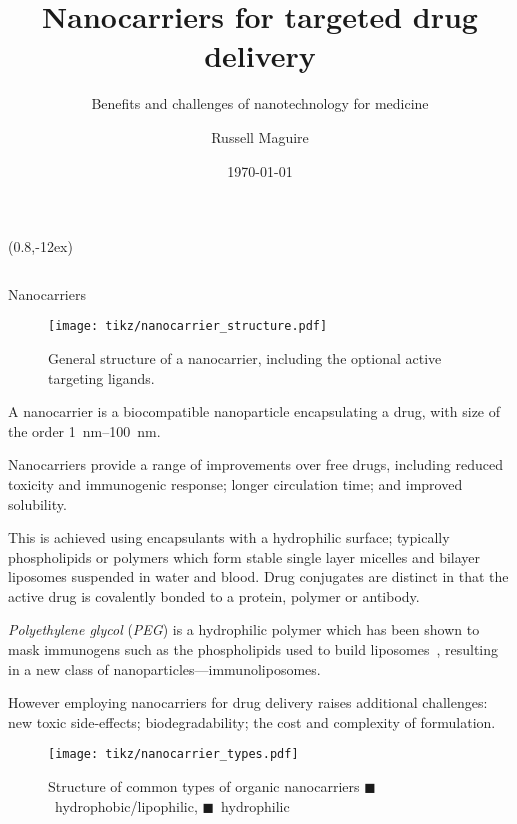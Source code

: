 \documentclass[final]{beamer}
\author{Russell Maguire}
\title{Nanocarriers for targeted drug delivery}
\subtitle{Benefits and challenges of nanotechnology for medicine}
\institute{ENGI4131 Advanced Semiconductor Devices \\ Durham University}
\date{\today}
\begin{document}
\begin{frame}[plain]
  
  \maketitle
  \begin{textblock*}{\textwidth}(0.8\textwidth,-12ex)
     \insertlogo
  \end{textblock*}

  \begin{columns}[t,onlytextwidth]
      \begin{block}{Nanocarriers\strut}
        \begin{multicols}{2}

          \begin{figure}[t]
            \centering
            \texttt{[image: tikz/nanocarrier\_structure.pdf]}
            \caption{General structure of a \alert{nanocarrier}, including the optional \alert{active targeting} ligands.}
            \label{fig:structure}
          \end{figure}

          A nanocarrier is a \alert{biocompatible nanoparticle encapsulating a drug}, with size of the order \SIrange{1}{100}{\nano\meter}.

          Nanocarriers provide a range of improvements over free drugs, including \alert{reduced toxicity} and \alert{immunogenic response}; \alert{longer circulation time}; and \alert{improved solubility}.

          This is achieved using encapsulants with a hydrophilic surface; typically phospholipids or polymers which form stable \alert{single layer micelles} and \alert{bilayer liposomes} suspended in water and blood. \alert{Drug conjugates} are distinct in that the active drug is covalently bonded to a protein, polymer or antibody.

          \emph{Polyethylene glycol} (\emph{PEG}) is a hydrophilic polymer which has been shown to mask immunogens such as the phospholipids used to build liposomes~\cite{harris2003effect}, resulting in a new class of nanoparticles---\alert{immunoliposomes}. 

          However employing nanocarriers for drug delivery raises additional challenges: new \alert{toxic side-effects}; \alert{biodegradability}; the \alert{cost} and \alert{complexity} of formulation.

          \begin{figure}[t]
            \centering
            \texttt{[image: tikz/nanocarrier\_types.pdf]}
            \caption{Structure of common types of organic nanocarriers
              \textcolor{palatinate!}{$\blacksquare$~hydrophobic/lipophilic},
              \textcolor{blue-palatinate!}{$\blacksquare$~hydrophilic}}
            \label{fig:types}
          \end{figure}


\end{multicols}
\end{block}
\end{columns}
\end{frame}
\end{document}
